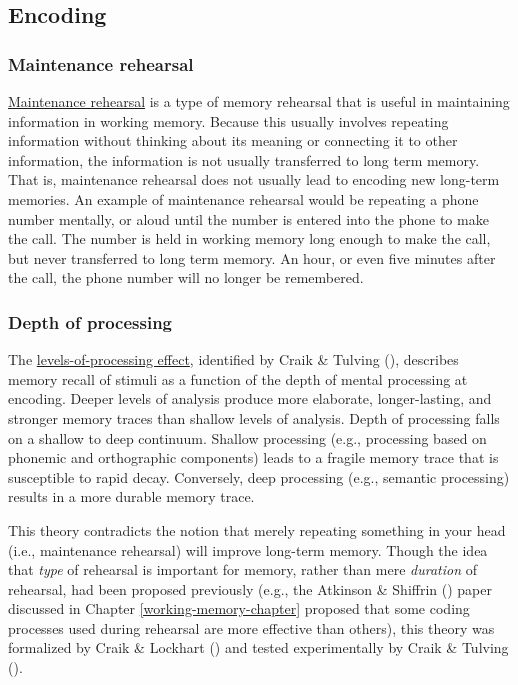 \documentclass[
]{krantz}
\begin{document}
\subsection*{Encoding}\label{encoding}


\subsubsection*{Maintenance rehearsal}\label{maintenance-rehearsal}


\hyperref[maintenance-rehearsal]{Maintenance rehearsal} is a type of memory rehearsal that is useful in maintaining information in working memory. Because this usually involves repeating information without thinking about its meaning or connecting it to other information, the information is not usually transferred to long term memory. That is, maintenance rehearsal does not usually lead to encoding new long-term memories. An example of maintenance rehearsal would be repeating a phone number mentally, or aloud until the number is entered into the phone to make the call. The number is held in working memory long enough to make the call, but never transferred to long term memory. An hour, or even five minutes after the call, the phone number will no longer be remembered.

\subsubsection*{Depth of processing}\label{depth-of-processing}


The \hyperref[levels-of-processing-effect]{levels-of-processing effect}, identified by Craik \& Tulving (), describes memory recall of stimuli as a function of the depth of mental processing at encoding. Deeper levels of analysis produce more elaborate, longer-lasting, and stronger memory traces than shallow levels of analysis. Depth of processing falls on a shallow to deep continuum. Shallow processing (e.g., processing based on phonemic and orthographic components) leads to a fragile memory trace that is susceptible to rapid decay. Conversely, deep processing (e.g., semantic processing) results in a more durable memory trace.

This theory contradicts the notion that merely repeating something in your head (i.e., maintenance rehearsal) will improve long-term memory. Though the idea that \emph{type} of rehearsal is important for memory, rather than mere \emph{duration} of rehearsal, had been proposed previously (e.g., the Atkinson \& Shiffrin () paper discussed in Chapter \ref{working-memory-chapter} proposed that some coding processes used during rehearsal are more effective than others), this theory was formalized by Craik \& Lockhart () and tested experimentally by Craik \& Tulving ().
\end{document}
